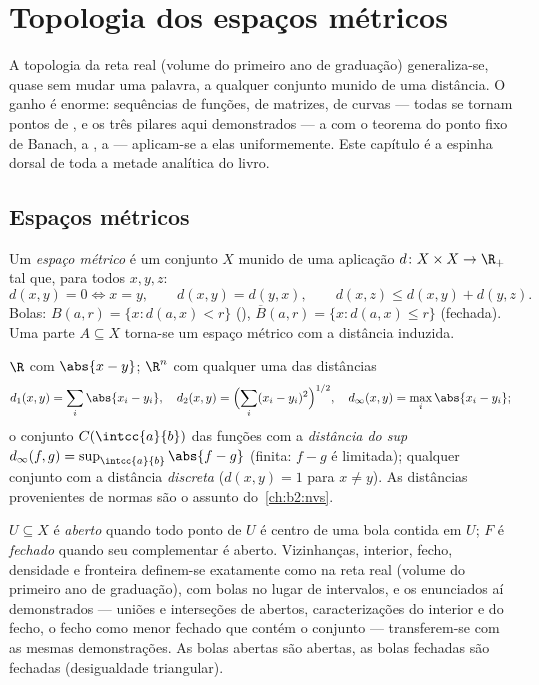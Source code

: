 \chapter{Topologia dos espaços métricos}\label{ch:b2:metric}

A topologia da reta real (volume do primeiro ano de graduação) generaliza-se, quase
sem mudar uma palavra, a qualquer conjunto munido de uma distância. O
ganho é enorme: sequências de funções, de matrizes, de curvas --- todas
se tornam pontos de , e os três pilares aqui demonstrados
--- a  com o teorema do ponto fixo de Banach, a ,
a  --- aplicam-se a elas uniformemente. Este capítulo é a
espinha dorsal de toda a metade analítica do livro.

\section{Espaços métricos}

\begin{definition}\label{def:b2:metric:def}
Um \emph{espaço métrico} é um conjunto $X$ munido de uma aplicação $d
\colon X \times X \to \R_+$ tal que, para todos $x, y, z$:
\[
d(x,y) = 0 \iff x = y,
\qquad
d(x,y) = d(y,x),
\qquad
d(x,z) \leq d(x,y) + d(y,z).
\]
Bolas: $B(a, r) = \{x : d(a,x) < r\}$ (), $\overline B(a,r) =
\{x : d(a,x) \leq r\}$ (fechada). Uma parte $A \subseteq X$ torna-se um
espaço métrico com a distância induzida.
\end{definition}

\begin{example}\label{ex:b2:metric:examples}
$\R$ com $\abs{x - y}$; $\R^n$ com qualquer uma das distâncias
\[
d_1(x,y) = \sum_i \abs{x_i - y_i},
\quad
d_2(x,y) = \Bigl(\sum_i (x_i - y_i)^2\Bigr)^{1/2},
\quad
d_\infty(x,y) = \max_i \abs{x_i - y_i};
\]
o conjunto $C(\intcc{a}{b})$ das funções  com a
\emph{distância do sup} $d_\infty(f, g) = \sup_{\intcc{a}{b}} \abs{f -
g}$ (finita: $f - g$ é limitada); qualquer conjunto com a distância
\emph{discreta} ($d(x,y) = 1$ para $x \neq y$). As distâncias provenientes de normas
são o assunto do~\cref{ch:b2:nvs}.
\end{example}

\begin{definition}\label{def:b2:metric:topology}
$U \subseteq X$ é \emph{aberto}
quando todo ponto de $U$ é centro de uma bola contida em $U$;
$F$ é \emph{fechado} quando seu complementar é aberto. Vizinhanças,
interior, fecho, densidade e fronteira definem-se exatamente como na
reta real (volume do primeiro ano de graduação), com bolas no lugar de intervalos, e os
enunciados aí demonstrados --- uniões e interseções de abertos,
caracterizações do interior e do fecho, o fecho como menor
fechado que contém o conjunto --- transferem-se com as mesmas demonstrações. As bolas abertas são
abertas, as bolas fechadas são fechadas (desigualdade triangular).
\end{definition}

